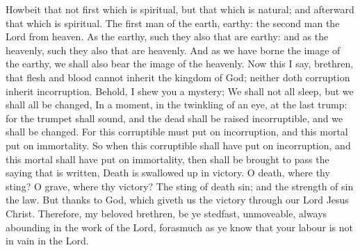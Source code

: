 {Howbeit
that
{}
not
first
which is
spiritual,
but that
which is
natural; and
afterward that
which is
spiritual.
The
first
man
{}
of the
earth,
earthy: the
second
man
{} the
Lord
from
heaven.
As
{} the
earthy,
such
{}
they
also that are
earthy:
and
as
{} the
heavenly,
such
{}
they
also that are
heavenly.
And
as we have
borne the
image of the
earthy, we
shall
also
bear the
image of the
heavenly.
Now
this I
say,
brethren,
that
flesh
and
blood
cannot
inherit the
kingdom of
God;
neither
doth
corruption
inherit
incorruption.
Behold, I
shew
you a
mystery; We
shall
not
all
sleep,
but we
shall
all be
changed,
In a
moment,
in the
twinkling of an
eye,
at the
last
trump:
for the trumpet shall
sound,
and the
dead shall be
raised
incorruptible,
and
we shall be
changed.
For
this
corruptible
must put
on
incorruption,
and
this
mortal
{} put
on
immortality.
So
when
this
corruptible shall have put
on
incorruption,
and
this
mortal shall have put
on
immortality,
then shall be brought to
pass the
saying
that is
written,
Death is swallowed
up
in
victory.
O
death,
where
{}
thy
sting? O
grave,
where
{}
thy
victory?
The
sting of
death
{}
sin;
and the
strength of
sin
{} the
law.
But
thanks
{} to
God, which
giveth
us the
victory
through
our
Lord
Jesus
Christ.
Therefore,
my
beloved
brethren, be
ye
stedfast,
unmoveable,
always
abounding
in the
work of the
Lord, forasmuch as ye
know
that
your
labour
is
not in
vain
in the
Lord.

}

